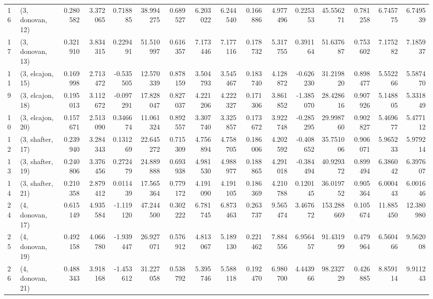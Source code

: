 \begin{tabular}{llrrrrrrrrrrrrrr}
16 &  (3, donovan, 12) &   0.280582 &  3.372065 &  0.718885 &  38.994275 &  0.689527 &   6.203022 &  6.244540 &  0.166886 &  4.977496 &  0.225353 &   45.556271 &  0.781258 &   6.745775 &   6.749539 \\
17 &  (3, donovan, 13) &   0.321910 &  3.834315 &  0.229491 &  51.510997 &  0.616357 &   7.173446 &  7.177116 &  0.178732 &  5.317755 &  0.391164 &   51.637687 &  0.753602 &   7.175282 &   7.185937 \\
11 &  (3, elcajon, 15) &   0.169998 &  2.713472 & -0.535505 &  12.570339 &  0.878159 &   3.504793 &  3.545467 &  0.183740 &  4.128872 & -0.626230 &   31.219820 &  0.898477 &   5.552266 &   5.587470 \\
9  &  (3, elcajon, 18) &   0.195013 &  3.112672 & -0.097291 &  17.828047 &  0.827037 &   4.221206 &  4.222327 &  0.171306 &  3.861852 & -1.385070 &   28.428616 &  0.907926 &   5.148805 &   5.331849 \\
10 &  (3, elcajon, 20) &   0.157671 &  2.513090 &  0.346674 &  11.061324 &  0.892557 &   3.307740 &  3.325857 &  0.173672 &  3.922748 & -0.285295 &   29.998760 &  0.902827 &   5.469677 &   5.477112 \\
12 &  (3, shafter, 17) &   0.239940 &  3.284343 &  0.131269 &  22.645272 &  0.715309 &   4.756894 &  4.758705 &  0.186006 &  4.202592 & -0.408652 &   35.751006 &  0.906071 &   5.965233 &   5.979214 \\
13 &  (3, shafter, 19) &   0.240806 &  3.376456 &  0.272479 &  24.889888 &  0.693938 &   4.981530 &  4.988977 &  0.188865 &  4.291018 & -0.384494 &   40.929372 &  0.899494 &   6.386042 &   6.397607 \\
14 &  (3, shafter, 21) &   0.210358 &  2.879412 &  0.011439 &  17.565364 &  0.779172 &   4.191090 &  4.191105 &  0.186369 &  4.210788 &  0.120145 &   36.019752 &  0.905364 &   6.000443 &   6.001646 \\
24 &  (4, donovan, 17) &   0.615149 &  4.935584 & -1.119120 &  47.244500 &  0.302222 &   6.781745 &  6.873463 &  0.263737 &  9.565474 &  3.467672 &  153.288669 &  0.105674 &  11.885450 &  12.380980 \\
25 &  (4, donovan, 19) &   0.492158 &  4.066780 & -1.939447 &  26.927071 &  0.576912 &   4.813067 &  5.189130 &  0.221462 &  7.884556 &  6.956457 &   91.431999 &  0.479964 &   6.560466 &   9.562008 \\
26 &  (4, donovan, 21) &   0.488343 &  3.918168 & -1.453612 &  31.227058 &  0.538792 &   5.395746 &  5.588118 &  0.192470 &  6.980700 &  4.443966 &   98.232729 &  0.426885 &   8.859114 &   9.911243 \\

\end{tabular}
